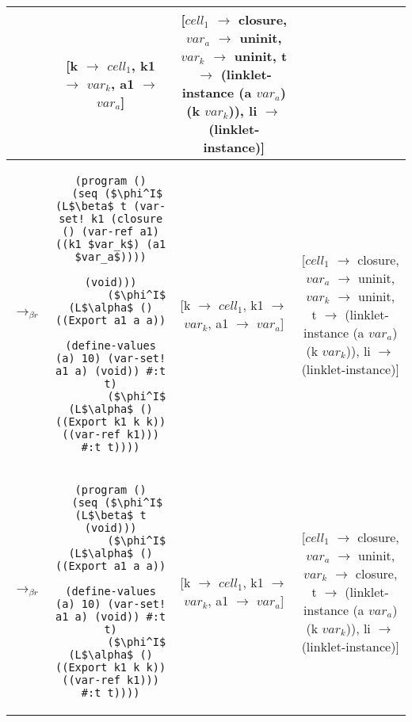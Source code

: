 \begin{table}[h!]
\begin{tabular}{lc|c|c}
\begin{lstlisting}[mathescape]
    \end{lstlisting} & \thead{[k $\rightarrow$ $cell_1$,\\k1 $\rightarrow$ $var_k$,\\a1 $\rightarrow$ $var_a$]} & \thead{[$cell_1$ $\rightarrow$ closure,\\$var_a$ $\rightarrow$ uninit,\\$var_k$ $\rightarrow$ uninit,\\t $\rightarrow$ (linklet-instance\\(a $var_a$) (k $var_k$)),\\li $\rightarrow$ (linklet-instance)]} \\ \hline
    $\longrightarrow_{\beta r}$&\begin{lstlisting}[mathescape]
(program ()
  (seq ($\phi^I$ (L$\beta$ t (var-set! k1 (closure () (var-ref a1) ((k1 $var_k$) (a1 $var_a$))))
                       (void)))
        ($\phi^I$ (L$\alpha$ () ((Export a1 a a))
                (define-values (a) 10) (var-set! a1 a) (void)) #:t t)
        ($\phi^I$ (L$\alpha$ () ((Export k1 k k)) ((var-ref k1))) #:t t))))
    \end{lstlisting} & \thead{[k $\rightarrow$ $cell_1$,\\k1 $\rightarrow$ $var_k$,\\a1 $\rightarrow$ $var_a$]} & \thead{[$cell_1$ $\rightarrow$ closure,\\$var_a$ $\rightarrow$ uninit,\\$var_k$ $\rightarrow$ uninit,\\t $\rightarrow$ (linklet-instance\\(a $var_a$) (k $var_k$)),\\li $\rightarrow$ (linklet-instance)]} \\ \hline
    $\longrightarrow_{\beta r}$&\begin{lstlisting}[mathescape]
(program ()
  (seq ($\phi^I$ (L$\beta$ t (void)))
        ($\phi^I$ (L$\alpha$ () ((Export a1 a a))
                (define-values (a) 10) (var-set! a1 a) (void)) #:t t)
        ($\phi^I$ (L$\alpha$ () ((Export k1 k k)) ((var-ref k1))) #:t t))))
    \end{lstlisting} & \thead{[k $\rightarrow$ $cell_1$,\\k1 $\rightarrow$ $var_k$,\\a1 $\rightarrow$ $var_a$]} & \thead{[$cell_1$ $\rightarrow$ closure,\\$var_a$ $\rightarrow$ uninit,\\$var_k$ $\rightarrow$ closure,\\t $\rightarrow$ (linklet-instance\\(a $var_a$) (k $var_k$)),\\li $\rightarrow$ (linklet-instance)]} \\ \hline

\end{tabular}
\end{table}
